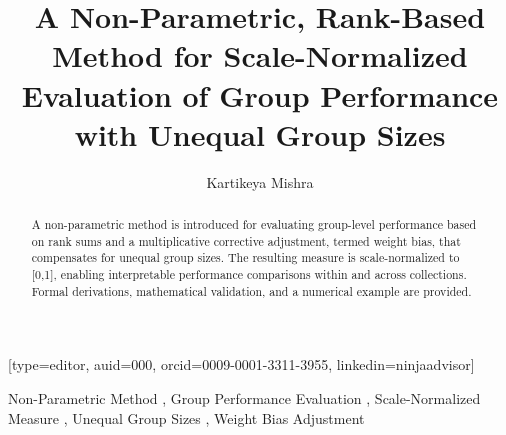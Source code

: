 \documentclass[a4paper,fleqn,review]{cas-sc}
\begin{document}
\let\WriteBookmarks\relax
\def\floatpagepagefraction{1}
\def\textpagefraction{.001}


\title [mode = title]{A Non-Parametric, Rank-Based Method for Scale-Normalized Evaluation of Group Performance with Unequal Group Sizes}            
\tnotemark[1]


\author[1]{Kartikeya Mishra}[type=editor,
auid=000,
orcid=0009-0001-3311-3955,
linkedin=ninjaadvisor]



\credit{}

\begin{abstract}
	 A non-parametric method is introduced for evaluating group-level performance based on rank sums and a multiplicative corrective adjustment, termed weight bias, that compensates for unequal group sizes. The resulting measure is scale-normalized to [0,1], enabling interpretable performance comparisons within and across collections. Formal derivations, mathematical validation, and a numerical example are provided.
\end{abstract}

%

\begin{keywords}
	Non-Parametric Method \sep 
	Group Performance Evaluation \sep
	Scale-Normalized Measure \sep 
	Unequal Group Sizes \sep 
	Weight Bias Adjustment 
\end{keywords}
\maketitle
\end{document}
